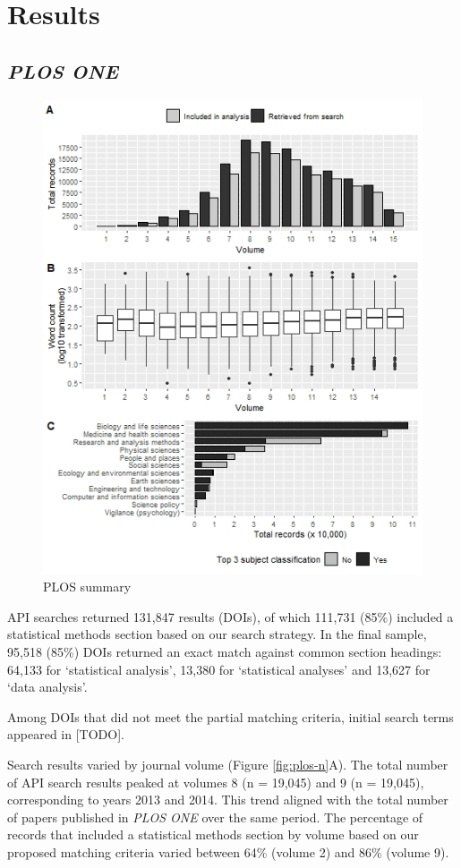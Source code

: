 \documentclass[12pt]{article}
\begin{document}
\hypertarget{results}{%
\section{Results}\label{results}}

\hypertarget{plos-one}{%
\subsection{\texorpdfstring{\emph{PLOS ONE}}{PLOS ONE}}\label{plos-one}}

\begin{figure}

{\centering \includegraphics[width=0.6\linewidth]{figures/plos.summary} 

}

\caption{\label{fig:plos-n}PLOS summary}\label{fig:unnamed-chunk-3}
\end{figure}

API searches returned 131,847 results (DOIs), of which 111,731 (85\%)
included a statistical methods section based on our search strategy. In
the final sample, 95,518 (85\%) DOIs returned an exact match against
common section headings: 64,133 for `statistical analysis', 13,380 for
`statistical analyses' and 13,627 for `data analysis'.

Among DOIs that did not meet the partial matching criteria, initial
search terms appeared in {[}TODO{]}.

Search results varied by journal volume (Figure \ref{fig:plos-n}A). The
total number of API search results peaked at volumes 8 (n = 19,045) and
9 (n = 19,045), corresponding to years 2013 and 2014. This trend aligned
with the total number of papers published in \emph{PLOS ONE} over the
same period. The percentage of records that included a statistical
methods section by volume based on our proposed matching criteria varied
between 64\% (volume 2) and 86\% (volume 9).
\end{document}
